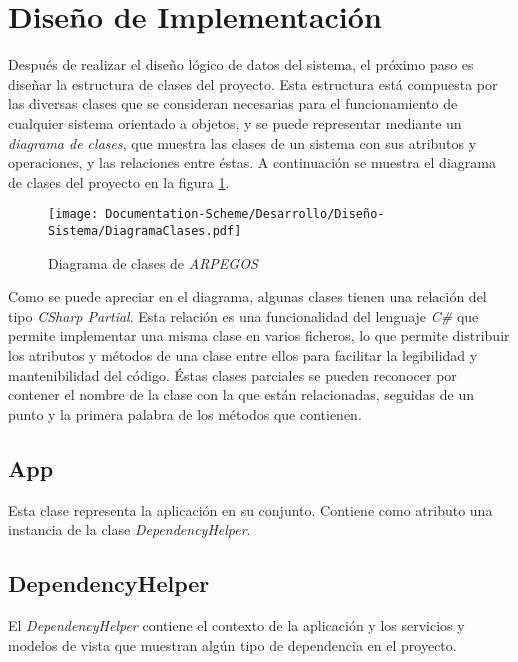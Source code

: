 
\section{Diseño de Implementación}
Después de realizar el diseño lógico de datos del sistema, el próximo paso es diseñar la estructura de clases del proyecto.
Esta estructura está compuesta por las diversas clases que se consideran necesarias para el funcionamiento de cualquier sistema 
orientado a objetos, y se puede representar mediante un \textit{diagrama de clases}, que muestra las clases de un sistema
con sus atributos y operaciones, y las relaciones entre éstas. A continuación se muestra el diagrama de clases del proyecto en 
la figura \ref*{DiagramaClases}.\medskip

\begin{figure}[ht]
    \centering
    \texttt{[image: Documentation-Scheme/Desarrollo/Diseño-Sistema/DiagramaClases.pdf]}
    \caption{Diagrama de clases de \textit{ARPEGOS}}
    \label{DiagramaClases}
\end{figure}

Como se puede apreciar en el diagrama, algunas clases tienen una relación del tipo \textit{CSharp Partial}. 
Esta relación es una funcionalidad del lenguaje \textit{C\#} que permite implementar una misma clase en 
varios ficheros, lo que permite distribuir los atributos y métodos de una clase entre ellos para facilitar 
la legibilidad y mantenibilidad del código. Éstas clases parciales se pueden reconocer por contener el nombre 
de la clase con la que están relacionadas, seguidas de un punto y la primera palabra de los métodos que contienen.

\subsection{App}
Esta clase representa la aplicación en su conjunto. Contiene como atributo una instancia de la 
clase \textit{DependencyHelper}.

\subsection{DependencyHelper}
El \textit{DependencyHelper} contiene el contexto de la aplicación y los servicios y modelos de vista 
que muestran algún tipo de dependencia en el proyecto.

